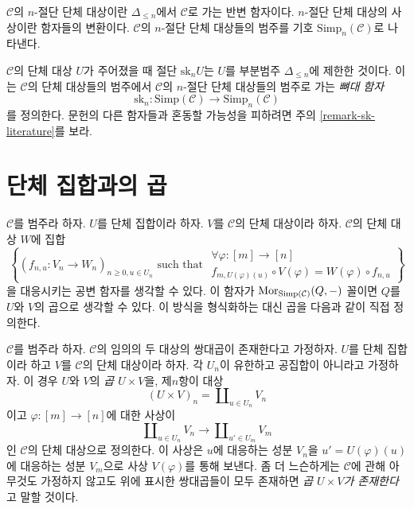\begin{definition}
\label{definition-truncated-simplicial-object}
{$\mathcal{C}$의 $n$-절단 단체 대상}이란 $\Delta_{\leq n}$에서
$\mathcal{C}$로 가는 반변 함자이다.
{$n$-절단 단체 대상의 사상}이란 함자들의 변환이다.
$\mathcal{C}$의 $n$-절단 단체 대상들의 범주를 기호
$\text{Simp}_n(\mathcal{C})$로 나타낸다.
\end{definition}

\noindent
$\mathcal{C}$의 단체 대상 $U$가 주어졌을 때 절단
$\text{sk}_n U$는 $U$를 부분범주 $\Delta_{\leq n}$에 제한한 것이다.
이는 $\mathcal{C}$의 단체 대상들의 범주에서 $\mathcal{C}$의
$n$-절단 단체 대상들의 범주로 가는 {\it 뼈대 함자}
$$
\text{sk}_n :
\text{Simp}(\mathcal{C}) \longrightarrow \text{Simp}_n(\mathcal{C})
$$
를 정의한다. 문헌의 다른 함자들과 혼동할 가능성을 피하려면
주의 \ref{remark-sk-literature}를 보라.




\section{단체 집합과의 곱}
\label{section-product-with-simplicial-sets}

\noindent
$\mathcal{C}$를 범주라 하자.
$U$를 단체 집합이라 하자.
$V$를 $\mathcal{C}$의 단체 대상이라 하자.
$\mathcal{C}$의 단체 대상 $W$에 집합
\begin{equation}
\label{equation-functor-product-with-simplicial-set}
\left\{
(f_{n, u} : V_n \to W_n)_{n \geq 0, u \in U_n}
\text{ such that }
\begin{matrix}
\forall \varphi : [m] \to [n] \\
f_{m, U(\varphi)(u)} \circ V(\varphi) = W(\varphi) \circ f_{n, u}
\end{matrix}
\right\}
\end{equation}
을 대응시키는 공변 함자를 생각할 수 있다.
이 함자가 $\mathop{\mathrm{Mor}}\nolimits_{\text{Simp}(\mathcal{C})}(Q, -)$ 꼴이면
$Q$를 $U$와 $V$의 곱으로 생각할 수 있다.
이 방식을 형식화하는 대신 곱을 다음과 같이 직접 정의한다.

\begin{definition}
\label{definition-product-with-simplicial-set}
$\mathcal{C}$를 범주라 하자. $\mathcal{C}$의 임의의 두 대상의
쌍대곱이 존재한다고 가정하자.
$U$를 단체 집합이라 하고 $V$를 $\mathcal{C}$의 단체 대상이라 하자.
각 $U_n$이 유한하고 공집합이 아니라고 가정하자.
이 경우 {$U$와 $V$의 {\it 곱 $U \times V$}}을, 제$n$항이 대상
$$
(U \times V)_n = \coprod\nolimits_{u\in U_n} V_n
$$
이고 $\varphi : [m] \to [n]$에 대한 사상이
$$
\coprod\nolimits_{u\in U_n} V_n
\longrightarrow
\coprod\nolimits_{u'\in U_m} V_m
$$
인 $\mathcal{C}$의 단체 대상으로 정의한다.
이 사상은 $u$에 대응하는 성분 $V_n$을
$u' = U(\varphi)(u)$에 대응하는 성분 $V_m$으로 사상
$V(\varphi)$를 통해 보낸다.
좀 더 느슨하게는 $\mathcal{C}$에 관해 아무것도 가정하지 않고도
위에 표시한 쌍대곱들이 모두 존재하면
{{\it 곱 $U \times V$가 존재한다}}고 말할 것이다.
\end{definition}

